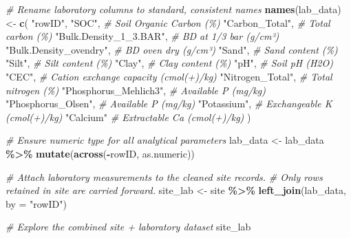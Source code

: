 \documentclass[
  10pt,
  b5paper,
  oneside]{book}
\newenvironment{Shaded}{\begin{snugshade}}{\end{snugshade}}
\newcommand{\AttributeTok}[1]{\textcolor[rgb]{0.13,0.29,0.53}{#1}}
\newcommand{\CommentTok}[1]{\textcolor[rgb]{0.56,0.35,0.01}{\textit{#1}}}
\newcommand{\FunctionTok}[1]{\textcolor[rgb]{0.13,0.29,0.53}{\textbf{#1}}}
\newcommand{\NormalTok}[1]{#1}
\newcommand{\OtherTok}[1]{\textcolor[rgb]{0.56,0.35,0.01}{#1}}
\newcommand{\SpecialCharTok}[1]{\textcolor[rgb]{0.81,0.36,0.00}{\textbf{#1}}}
\newcommand{\StringTok}[1]{\textcolor[rgb]{0.31,0.60,0.02}{#1}}
\begin{document}
\begin{Shaded}
\begin{Highlighting}[]
\CommentTok{\# Rename laboratory columns to standard, consistent names}
\FunctionTok{names}\NormalTok{(lab\_data) }\OtherTok{\textless{}{-}} \FunctionTok{c}\NormalTok{(}
  \StringTok{"rowID"}\NormalTok{,}
  \StringTok{"SOC"}\NormalTok{,                             }\CommentTok{\# Soil Organic Carbon (\%)}
  \StringTok{"Carbon\_Total"}\NormalTok{,                    }\CommentTok{\# Total carbon (\%)}
  \StringTok{"Bulk.Density\_1\_3.BAR"}\NormalTok{,            }\CommentTok{\# BD at 1/3 bar (g/cm³)}
  \StringTok{"Bulk.Density\_ovendry"}\NormalTok{,             }\CommentTok{\# BD oven dry (g/cm³)}
  \StringTok{"Sand"}\NormalTok{,                            }\CommentTok{\# Sand content (\%)}
  \StringTok{"Silt"}\NormalTok{,                            }\CommentTok{\# Silt content (\%)}
  \StringTok{"Clay"}\NormalTok{,                            }\CommentTok{\# Clay content (\%)}
  \StringTok{"pH"}\NormalTok{,                              }\CommentTok{\# Soil pH (H2O)}
  \StringTok{"CEC"}\NormalTok{,                             }\CommentTok{\# Cation exchange capacity (cmol(+)/kg)}
  \StringTok{"Nitrogen\_Total"}\NormalTok{,                  }\CommentTok{\# Total nitrogen (\%)}
  \StringTok{"Phosphorus\_Mehlich3"}\NormalTok{,             }\CommentTok{\# Available P (mg/kg)}
  \StringTok{"Phosphorus\_Olsen"}\NormalTok{,                }\CommentTok{\# Available P (mg/kg)}
  \StringTok{"Potassium"}\NormalTok{,                       }\CommentTok{\# Exchangeable K (cmol(+)/kg)}
  \StringTok{"Calcium"}                          \CommentTok{\# Extractable Ca (cmol(+)/kg)}
\NormalTok{)}

\CommentTok{\# Ensure numeric type for all analytical parameters}
\NormalTok{lab\_data }\OtherTok{\textless{}{-}}\NormalTok{ lab\_data }\SpecialCharTok{\%\textgreater{}\%}
  \FunctionTok{mutate}\NormalTok{(}\FunctionTok{across}\NormalTok{(}\SpecialCharTok{{-}}\NormalTok{rowID, as.numeric))}

\CommentTok{\# Attach laboratory measurements to the cleaned site records.}
\CommentTok{\# Only rows retained in \textasciigrave{}site\textasciigrave{} are carried forward.}
\NormalTok{site\_lab }\OtherTok{\textless{}{-}}\NormalTok{ site }\SpecialCharTok{\%\textgreater{}\%}
  \FunctionTok{left\_join}\NormalTok{(lab\_data, }\AttributeTok{by =} \StringTok{"rowID"}\NormalTok{)}

\CommentTok{\# Explore the combined site + laboratory dataset}
\NormalTok{site\_lab}
\end{Highlighting}
\end{Shaded}
\end{document}
